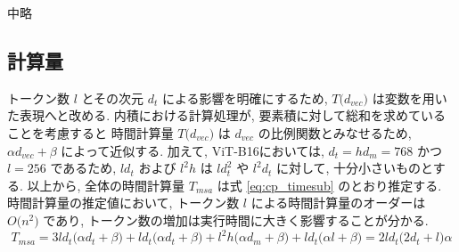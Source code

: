 中略

\subsection{計算量}
\label{sec:calc}
トークン数 $l$ とその次元 $d_{t}$ による影響を明確にするため, 
$T \lparen d_{vec} \rparen$ は変数を用いた表現へと改める. 
内積における計算処理が, 要素積に対して総和を求めていることを考慮すると 
時間計算量 $T \lparen d_{vec} \rparen$ は $d_{vec}$ の比例関数とみなせるため, 
$\alpha d_{vec} + \beta$ によって近似する. 
加えて, ViT-B16においては, $d_{t}=hd_{m}=768$ かつ $l=256$ であるため, 
$ld_{t}$ および $l^{2}h$ は $ld_{t}^{2}$ や $l^{2}d_{t}$ に対して, 十分小さいものとする. 
以上から, 全体の時間計算量 $T_{msa}$ は式 \eqref{eq:cp_timesub} のとおり推定する.
時間計算量の推定値において, トークン数 $l$ による時間計算量のオーダーは 
$O \lparen n^{2} \rparen$ であり, トークン数の増加は実行時間に大きく影響することが分かる. 
\begin{equation}
  \label{eq:cp_timesub}
  T_{msa} = 3 l d_{t} \lparen \alpha d_{t} + \beta \rparen + l d_{t} \lparen \alpha d_{t} + \beta \rparen 
  + l^{2} h \lparen \alpha d_{m} + \beta \rparen + l d_{t} \lparen \alpha l + \beta \rparen
  = 2 l d_{t} \lparen 2 d_{t} + l \rparen \alpha  
\end{equation} 





